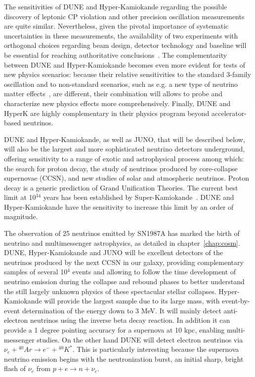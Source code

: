 The sensitivities of DUNE and Hyper-Kamiokande regarding the possible discovery of leptonic CP violation and other precision oscillation measurements are quite similar.
Nevertheless, given the pivotal importance of systematic uncertainties in these measurements, the
availability of two experiments with orthogonal choices regarding beam design, detector technology
and baseline will be essential for reaching authoritative conclusions~\cite{Cao:2015ita}.
The complementarity between DUNE and Hyper-Kamiokande becomes even more evident for tests of new
physics scenarios: because their relative sensitivities to the standard 3-family oscillation and to
non-standard scenarios, such as e.g. a new type of neutrino matter effects~\cite{Liao:2016orc}, are different, their
combination will allows to probe and characterize new physics effects more comprehensively.
Finally, DUNE and HyperK are highly complementary in their physics program beyond
accelerator-based neutrinos.



DUNE and Hyper-Kamiokande, as well as JUNO, that will be described below, will also be the largest and more sophisticated neutrino detectors underground, offering sensitivity to a range of exotic and astrophysical process among which:
the search for proton decay, the study of neutrinos produced by core-collapse supernovae (CCSN), and new studies of solar and atmospheric neutrinos. 
Proton decay is a generic prediction of Grand Unification Theories. The current best limit  at 10$^{34}$ years has been established by Super-Kamiokande~\cite{Miura:2016krn}. DUNE and Hyper-Kamiokande have the sensitivity to increase this limit by an order of magnitude. 

The observation of 25 neutrinos emitted by SN1987A has marked the birth of neutrino  and multimessenger astrophysics, as detailed in chapter~\ref{chap:cosm}. DUNE, Hyper-Kamiokande and JUNO will be excellent detectors of the neutrinos produced by the next CCSN in our galaxy, providing complementary samples of several 10$^4$ events and  allowing to follow the time development of neutrino emission during the collapse and rebound phases to better understand the still largely unknown physics of these spectacular stellar collapses. 
Hyper-Kamiokande will provide the largest sample due to its large mass, with event-by-event determination of the energy down to 3 MeV. It will mainly detect anti-electron neutrinos using the inverse beta decay reaction. In addition it can provide a 1 degree pointing accuracy for a supernova at 10 kpc, enabling multi-messenger studies. On the other hand DUNE will detect electron neutrinos via $\nu_e + {}^{40} Ar \rightarrow e^- + {}^{40} K^*$. This is particularly interesting because the supernova neutrino emission begins with the neutronization burst, an initial sharp, bright flash of $\nu_e$  from $ p + e \rightarrow  n + \nu_e$.

